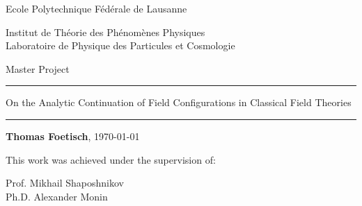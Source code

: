 \begin{adjustwidth}{-4.1cm}{-4.1cm}
  \center
  \parbox{16cm}{\center \LARGE \sc
    Ecole Polytechnique Fédérale de Lausanne\\
    \parbox{\textwidth}{\center \large
      Institut de Théorie des Phénomènes Physiques\\
      Laboratoire de Physique des Particules et Cosmologie}
    \vspace{1cm}
  }
  
  \parbox{\textwidth}{\Huge\center
    Master Project
    \vspace{1cm}}
  
  \rule{18cm}{3pt}
  \parbox{16cm}{
    \vspace{1cm}
    \Huge\center
    On the Analytic Continuation of Field
    Configurations in Classical Field Theories
    \vspace{1cm}
  }
  \rule{18cm}{3pt}
  
  \vspace{2cm}
  \begin{abstract}
    \center
    \parbox{11cm}{
      \setlength{\parindent}{18pt}
      \em 
    }
  \end{abstract}
  
  \parbox{10cm}{\vspace{2cm}\center \large
    {\bfseries Thomas Foetisch}, \today
  }
  
  \vspace{4cm}
  \parbox[t]{9cm}{\flushleft \large
    This work was achieved under the supervision of:
  }
  \parbox[t]{7cm}{\flushright \large
    Prof. Mikhail Shaposhnikov\\
    Ph.D. Alexander Monin
  }
\end{adjustwidth}
